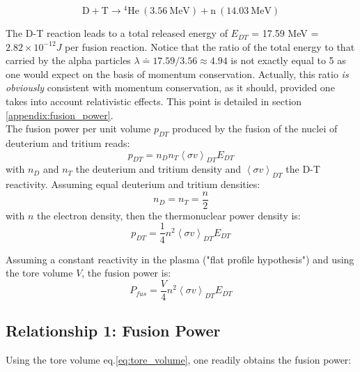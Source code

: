 \begin{equation*}
    \mathrm{D + T} \longrightarrow \mathrm{{}^4 He~(3.56~MeV) + n~(14.03~MeV)}
\end{equation*}

The D-T reaction leads to a total released energy of $E_{DT}$ = 17.59 \si{MeV} = $2.82\times 10^{-12} \si{J}$ per fusion reaction. Notice that the ratio of the total energy to that carried by the alpha particles $\lambda \doteq 17.59/3.56 \approx 4.94$ is not exactly equal to 5 as one would expect on the basis of momentum conservation. Actually, this ratio \emph{is obviously} consistent with momentum conservation, as it should, provided one takes into account relativistic effects. This point is detailed in section \ref{appendix:fusion_power}.\\

The fusion power per unit volume $p_{DT}$ produced by the fusion of the nuclei of deuterium and tritium reads: 
\begin{equation*}
  p_{DT} = n_D n_T \left< \sigma v \right>_{DT} E_{DT}
\end{equation*}
with $n_D$ and $n_T$ the deuterium and tritium density and $\left< \sigma v \right>_{DT}$ the D-T reactivity. Assuming equal deuterium and tritium densities:
\begin{equation*}
  n_D = n_T = \frac{n}{2}
\end{equation*}
with $n$ the electron density, then the thermonuclear power density is:
\begin{equation*}
  p_{DT} = \frac{1}{4} n^2 \left< \sigma v \right>_{DT} E_{DT}
\end{equation*}

Assuming a constant reactivity in the plasma ("flat profile hypothesis") and using the tore volume $V$, the fusion power is: 
\begin{equation}
  P_{fus} = \frac{V}{4}
    n^2 \left< \sigma v \right>_{DT} E_{DT}
\end{equation}



\subsection{Relationship 1: Fusion Power}
Using the tore volume eq.\ref{eq:tore_volume}, one readily obtains the fusion power:

